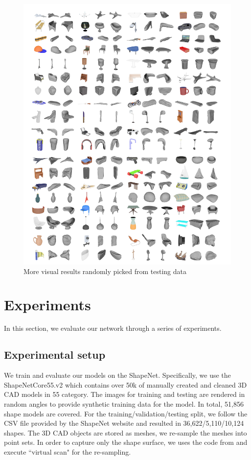 \begin{figure}[htbp]
	\centering
	\includegraphics[width=\linewidth]{img/more_res/res}
	\caption{More visual results randomly picked from testing data}
	\label{fig:more_res}
\end{figure}
\section{Experiments}
In this section, we evaluate our network through a series of experiments.
\subsection{Experimental setup}
We train and evaluate our models on the ShapeNet\cite{shapenetdata}. Specifically, we use the ShapeNetCore55.v2 which contains over 50k of
manually created and cleaned 3D CAD models in 55 category.
The images for training
and testing are rendered in random angles to provide synthetic training data for the model. In total,
51,856 shape models are covered. For the training/validation/testing split, we follow the CSV file provided by the ShapeNet website and resulted in 36,622/5,110/10,124 shapes. The 3D CAD objects are
stored as meshes, we re-sample the meshes into point sets. In order to capture only the shape surface, we uses the code from \cite{ocnn} and execute ``virtual scan" for the re-sampling.

